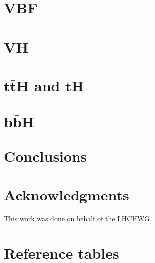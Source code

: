\documentclass[11pt]{article}
\begin{document}
\section{VBF}


\section{VH}


\section{$\boldsymbol{t\bar{t}H}$ and $\boldsymbol{tH}$}


\section{$\boldsymbol{b\bar{b}H}$}


\section{Conclusions}


\section*{Acknowledgments}
This work was done on behalf of the LHCHWG.
\newpage
\appendix
\section{Reference tables}



\end{document}
